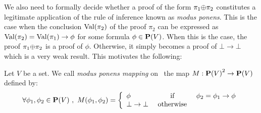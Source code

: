 We also need to formally decide whether a proof of the form
$\pi_{1}\mbox{$\oplus$}\pi_{2}$ constitutes a legitimate application of the
rule of inference known as {\em modus ponens}. This is the case when
the conclusion $\mbox{\rm Val}(\pi_{2})$ of the proof $\pi_{2}$ can be
expressed as $\mbox{\rm Val}(\pi_{2})=\mbox{\rm Val}(\pi_{1})\to\phi$ for some formula
$\phi\in\mbox{${\bf P}(V)$}$. When this is the case, the proof $\pi_{1}\mbox{$\oplus$}\pi_{2}$
is a proof of $\phi$. Otherwise, it simply becomes a proof of
$\bot\to\bot$ which is a very weak result. This motivates the
following: 
\begin{defin}\label{logic:def:FOPL:modus:ponens}
Let $V$ be a set. We call {\em modus ponens mapping} on \pv\ the map
$M:\mbox{${\bf P}(V)$}^{2}\rightarrow \mbox{${\bf P}(V)$}$ defined by:
    \[
    \forall \phi_{1},\phi_{2}\in\mbox{${\bf P}(V)$}\ ,\
    M(\phi_{1},\phi_{2})=\left\{
        \begin{array}{lcl}
        \phi&\mbox{\ if\ }&\phi_{2}=\phi_{1}\to\phi\\
        \bot\to\bot&\mbox{\ otherwise\ }&\\
        \end{array}
    \right.
    \]
\end{defin}

